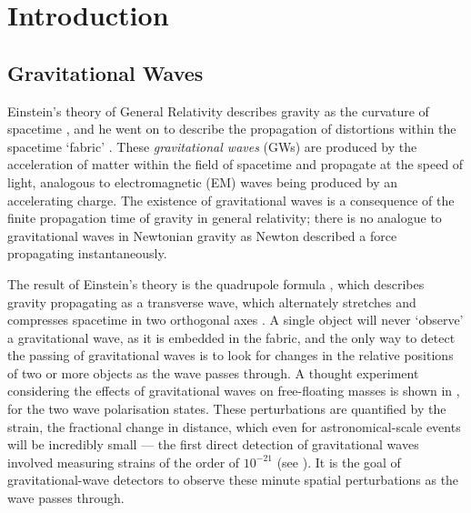 
\chapter{Introduction}
\label{chap:intro}


\chaptoc{}


\section{Gravitational Waves}
\label{sec:gw}


\begin{colsection}

Einstein's theory of General Relativity describes gravity as the curvature of spacetime \citep{Einstein1914}, and he went on to describe the propagation of distortions within the spacetime `fabric' \citep{Einstein1916}. These \emph{gravitational waves} (GWs)  are produced by the acceleration of matter within the field of spacetime and propagate at the speed of light, analogous to electromagnetic (EM)  waves being produced by an accelerating charge. The existence of gravitational waves is a consequence of the finite propagation time of gravity in general relativity; there is no analogue to gravitational waves in Newtonian gravity as Newton described a force propagating instantaneously.

The result of Einstein's theory is the quadrupole formula \citep{Einstein1916}, which describes gravity propagating as a transverse wave, which alternately stretches and compresses spacetime in two orthogonal axes \citep{BIGcardiff}. A single object will never `observe' a gravitational wave, as it is embedded in the fabric, and the only way to detect the passing of gravitational waves is to look for changes in the relative positions of two or more objects as the wave passes through. A thought experiment considering the effects of gravitational waves on free-floating masses is shown in , for the two wave polarisation states. These perturbations are quantified by the strain, the fractional change in distance, which even for astronomical-scale events will be incredibly small --- the first direct detection of gravitational waves involved measuring strains of the order of $10^{-21}$ (see ). It is the goal of gravitational-wave detectors to observe these minute spatial perturbations as the wave passes through.


\end{colsection}
